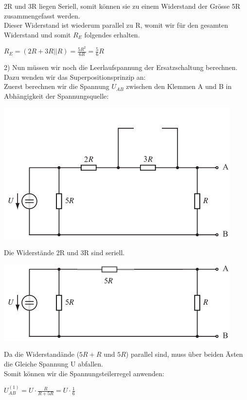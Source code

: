2R und 3R liegen Seriell, somit können sie zu einem Widerstand der Grösse 5R zusammengefasst werden. \\
Dieser Widerstand ist wiederum parallel zu R, womit wir für den gesamten Widerstand und somit $R_E$ folgendes erhalten. \\
\begin{center}
  $R_E = (2R + 3R || R) = \frac{5R^2}{6R} = \frac{5}{6}R$
\end{center}

2) Nun müssen wir noch die Leerlaufspannung der Ersatzschaltung berechnen. Dazu wenden wir das Superpositionsprinzip an: \\
Zuerst berechnen wir die Spannung $U_{AB}$ zwischen den Klemmen A und B in Abhängigkeit der Spannungsquelle: \\


\begin{center}
\includegraphics[scale=1.5]{katalog/katalog-1/uu-1.png}

\end{center}
\newpage
Die Widerstände 2R und 3R sind seriell.
\begin{center}
    \includegraphics[scale=1.5]{katalog/katalog-1/uu-2.png}
\end{center}

Da die Widerstandände ($ 5R + R$ und $5R$) parallel sind, muss über beiden Ästen die Gleiche Spannung U abfallen. \\
Somit können wir die Spannungsteilerregel anwenden: \\
\begin{center}
    $U_{AB}^{(1)} = U \cdot \frac{R}{R + 5R} = U \cdot \frac{1}{6}$
\end{center}

